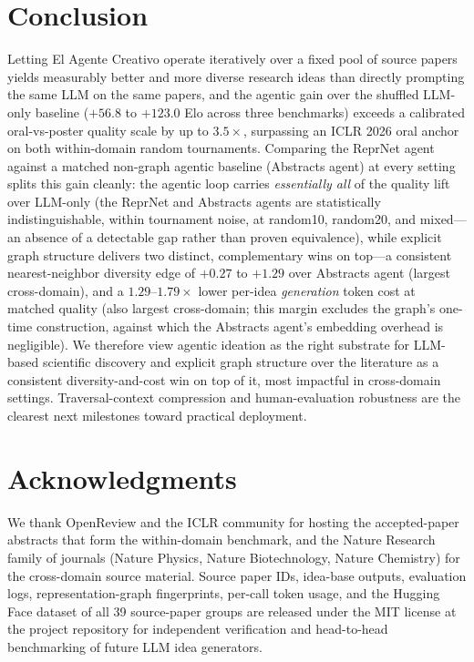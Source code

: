 \documentclass[10pt,twocolumn]{article}
\begin{document}
\section{Conclusion}

Letting El Agente Creativo operate iteratively over a fixed pool of
source papers yields measurably better and more diverse research ideas
than directly prompting the same LLM on the same papers, and the
agentic gain over the shuffled LLM-only baseline ($+56.8$ to $+123.0$
Elo across three benchmarks) exceeds a calibrated oral-vs-poster
quality scale by up to $3.5\times$, surpassing an ICLR 2026 oral
anchor on both within-domain random tournaments.  Comparing the ReprNet
agent against a matched non-graph agentic baseline (Abstracts agent) at every
setting splits this gain cleanly: the agentic loop carries
\emph{essentially all} of the quality lift over LLM-only (the ReprNet and
Abstracts agents are statistically indistinguishable, within
tournament noise, at random10, random20, and mixed---an absence of a
detectable gap rather than proven equivalence),
while explicit graph structure delivers two distinct, complementary
wins on top---a consistent nearest-neighbor diversity edge of $+0.27$
to $+1.29$ over Abstracts agent (largest cross-domain), and a
$1.29$--$1.79\times$ lower per-idea \emph{generation} token cost at
matched quality (also largest cross-domain; this margin excludes the
graph's one-time construction, against which the Abstracts agent's
embedding overhead is negligible).  We therefore view agentic ideation as
the right substrate for LLM-based scientific discovery and explicit
graph structure over the literature as a consistent diversity-and-cost
win on top of it, most impactful in cross-domain settings.
Traversal-context compression and human-evaluation robustness are the
clearest next milestones toward practical deployment.

\section*{Acknowledgments}

We thank OpenReview and the ICLR community for hosting the
accepted-paper abstracts that form the within-domain benchmark, and
the Nature Research family of journals (Nature Physics, Nature
Biotechnology, Nature Chemistry) for the cross-domain source
material.  Source paper IDs, idea-base outputs, evaluation logs,
representation-graph fingerprints, per-call token usage, and the
Hugging Face dataset of all 39 source-paper groups are released under
the MIT license at the project repository for independent
verification and head-to-head benchmarking of future LLM idea
generators.
\end{document}
